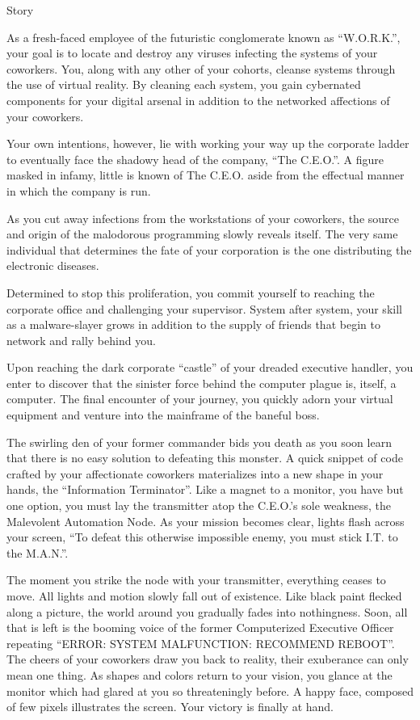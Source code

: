 \documentclass[12pt]{report}
\begin{document}
\begin{section}{Story}

As a fresh-faced employee of the futuristic conglomerate known as
``W.O.R.K.'', your goal is to locate and destroy any viruses infecting the
systems of your coworkers. You, along with any other of your cohorts,
cleanse systems through the use of virtual reality. By cleaning each system,
you gain cybernated components for your digital arsenal in addition to 
the networked affections of your coworkers.

Your own intentions, however, lie with working your way up the corporate
ladder to eventually face the shadowy head of the company, ``The C.E.O.''.
A figure masked in infamy, little is known of The C.E.O. aside from the
effectual manner in which the company is run.

As you cut away infections from the workstations of your coworkers, the
source and origin of the malodorous programming slowly reveals itself. The
very same individual that determines the fate of your corporation is the one
distributing the electronic diseases.

Determined to stop this proliferation, you commit yourself to reaching the
corporate office and challenging your supervisor. System after system, your
skill as a malware-slayer grows in addition to the supply of friends that
begin to network and rally behind you.

Upon reaching the dark corporate ``castle'' of your dreaded executive
handler, you enter to discover that the sinister force behind the computer
plague is, itself, a computer. The final encounter of your journey, you
quickly adorn your virtual equipment and venture into the mainframe of the
baneful boss.

The swirling den of your former commander bids you death as you soon learn
that there is no easy solution to defeating this monster. A quick snippet of
code crafted by your affectionate coworkers materializes into a new shape
in your hands, the ``Information Terminator''. Like a magnet to a monitor,
you have but one option, you must lay the transmitter atop the C.E.O.'s 
sole weakness, the Malevolent Automation Node. As your mission becomes
clear, lights flash across your screen, ``To defeat this otherwise
impossible enemy, you must stick I.T. to the M.A.N.''.

The moment you strike the node with your transmitter, everything ceases to
move. All lights and motion slowly fall out of existence. Like black paint
flecked along a picture, the world around you gradually fades into
nothingness. Soon, all that is left is the booming voice of the former 
Computerized Executive Officer repeating ``ERROR: SYSTEM MALFUNCTION:
RECOMMEND REBOOT''. The cheers of your coworkers draw you back to reality,
their exuberance can only mean one thing. As shapes and colors return to
your vision, you glance at the monitor which had glared at you so
threateningly before. A happy face, composed of few pixels illustrates the
screen. Your victory is finally at hand.
\end{section}
\end{document}
